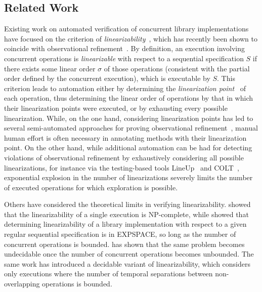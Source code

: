 \subsection{Related Work}
\label{sec:related}

Existing work on automated verification of concurrent library implementations
have focused on the criterion of
\emph{linearizability}~\citep{journals/toplas/HerlihyW90}, which has recently
been shown to coincide with observational
refinement~\citep{journals/tcs/FilipovicORY10}. By definition, an execution
involving concurrent operations is \emph{linearizable} with respect to a
sequential specification $S$ if there exists some linear order $\sigma$ of
those operations (consistent with the partial order defined by the concurrent execution), 
which is executable by $S$. This criterion leads to automation
either by determining the \emph{linearization
point}~\citep{journals/toplas/HerlihyW90} of each operation, thus determining
the linear order of operations by that in which their linearization points were
executed, or by exhausting every possible linearization. While, on the one
hand, considering linearization points has led to several semi-automated
approaches for proving observational refinement~\citep{DBLP:conf/cav/AmitRRSY07,conf/fm/LiuCLS09, conf/podc/OHearnRVYY10,
conf/cav/Vafeiadis10, conf/icse/Zhang11a, conf/pldi/LiangF13,
conf/cav/DragoiGH13}, manual human effort is often necessary in annotating
methods with their linearization point. On the other hand, while additional
automation can be had for detecting violations of observational refinement 
by exhaustively considering all possible linearizations,
for instance via the testing-based tools LineUp~\citep{conf/pldi/BurckhardtDMT10} and COLT~\citep{DBLP:conf/oopsla/ShachamBASVY11}, exponential
explosion in the number of linearizations severely limits the number of
executed operations for which exploration is possible.

Others have considered the theoretical limits in verifying linearizability.
\citet{journals/siamcomp/GibbonsK97} showed that the linearizability of a
single execution is NP-complete, while \citet{journals/iandc/AlurMP00} showed
that determining linearizability of a library implementation with respect to a
given regular sequential specification is in EXPSPACE, so long as the number of
concurrent operations is bounded. \citet{conf/esop/BouajjaniEEH13} has shown that the same
problem becomes undecidable once the number of concurrent operations becomes
unbounded. The same work has introduced a decidable variant of linearizability, which
considers only executions where the number of temporal separations between non-overlapping 
operations is bounded.
%

